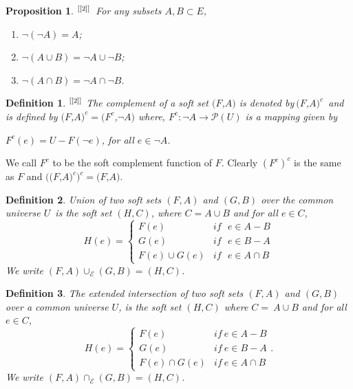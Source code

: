 \documentclass{amsart}
\theoremstyle{plain}
\newtheorem{definition}{Definition}
\newtheorem{proposition}{Proposition}
\numberwithin{equation}{section}
\begin{document}
\begin{proposition}
$^{\text{\cite{[2]}}}$\ For any subsets $A,B\subset E$,

\begin{enumerate}
\item $\lnot (\lnot A)=A$;

\item $\lnot (A\cup B)=\lnot A\cup \lnot B$;

\item $\lnot (A\cap B)=\lnot A\cap \lnot B$.
\end{enumerate}
\end{proposition}

\begin{definition}
$^{\text{\cite{[2]}}}$ The \textit{complement of a soft set }$(F$,$A)$ is
denoted by$\ (F$,$A)^{c}$\ and is defined by $(F$,$A)^{c}=(F^{c}$,$\lnot A)$
where, $F^{c}:\lnot A\rightarrow \mathcal{P}(U)$ is a mapping given by

$F^{c}(e)=U-F(\lnot e)$, for all $e\in \lnot A$.
\end{definition}

We call $F^{c}$ to be the soft complement function of $F$. Clearly $(F^{c})^{c}$ is the same as $F$ and $((F$,$A)^{c})^{c}=(F$,$A)$.

\begin{definition}
\cite{[3]} \textit{Union of two soft sets} $(F,A)$ and $(G,B)$ over the
common universe $U$\ is the soft set $(H,C)$, where $C=A\cup B$ and for all $e\in C$,\begin{equation*}
H(e)=\left\{ 
\begin{array}{cc}
F(e) & if\text{ }e\in A-B \\ 
G(e) & if\text{ }e\in B-A \\ 
F(e)\cup G(e) & if\text{ }e\in A\cap B\end{array}\right. 
\end{equation*}We write $(F,A)\cup _{\mathcal{E}}(G,B)=(H,C)$.
\end{definition}

\begin{definition}
\cite{[3]} \textit{The extended intersection} of two soft sets $(F,A)$ and $(G,B)$ over a common universe $U$, is the soft set $(H,C)$ where $C=\ A\cup B
$ and for all $e\in C$,\begin{equation*}
H\left( e\right) =\left\{ 
\begin{array}{cc}
F\left( e\right)  & if\ e\in A-B \\ 
G\left( e\right)  & if\ e\in B-A \\ 
F\left( e\right) \cap G\left( e\right)  & if\ e\in A\cap B\end{array}\right. .
\end{equation*}We write $(F,A)\cap _{\mathcal{E}}(G,B)=(H,C)$.
\end{definition}
\end{document}
